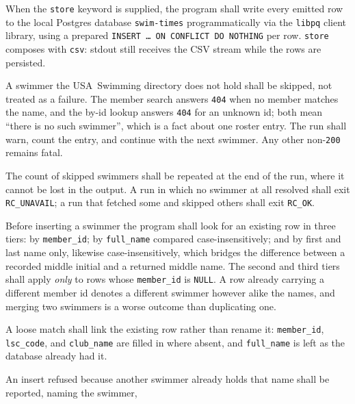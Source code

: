 \documentclass[12pt]{article}
\newcommand{\code}[1]{\texttt{#1}}
\newcommand{\req}[1]{\textbf{[#1]}}
\begin{document}
\begin{description}[style=nextline]
  \item[\req{REQ-F-70}] When the \code{store} keyword is supplied,
        the program shall write every emitted row to the local
        Postgres database \texttt{swim-times} programmatically via
        the \texttt{libpq} client library, using a prepared
        \texttt{INSERT \dots\ ON~CONFLICT~DO~NOTHING} per row.
        \code{store} composes with \code{csv}: stdout still
        receives the CSV stream while the rows are persisted.
  \item[\req{REQ-F-77}] A swimmer the USA~Swimming directory does not
        hold shall be skipped, not treated as a failure.  The member
        search answers \code{404} when no member matches the name, and
        the by-id lookup answers \code{404} for an unknown id; both mean
        ``there is no such swimmer'', which is a fact about one roster
        entry.  The run shall warn, count the entry, and continue with
        the next swimmer.  Any other non-\code{200} remains fatal.
  \item[\req{REQ-F-77a}] The count of skipped swimmers shall be
        repeated at the end of the run, where it cannot be lost in the
        output.  A run in which no swimmer at all resolved shall exit
        \code{RC\_UNAVAIL}; a run that fetched some and skipped others
        shall exit \code{RC\_OK}.
  \item[\req{REQ-F-78}] Before inserting a swimmer the program shall
        look for an existing row in three tiers: by \code{member\_id};
        by \code{full\_name} compared case-insensitively; and by first
        and last name only, likewise case-insensitively, which bridges
        the difference between a recorded middle initial and a returned
        middle name.  The second and third tiers shall apply
        \emph{only} to rows whose \code{member\_id} is \code{NULL}.  A
        row already carrying a different member id denotes a different
        swimmer however alike the names, and merging two swimmers is a
        worse outcome than duplicating one.
  \item[\req{REQ-F-79}] A loose match shall link the existing row
        rather than rename it: \code{member\_id}, \code{lsc\_code}, and
        \code{club\_name} are filled in where absent, and
        \code{full\_name} is left as the database already had it.
  \item[\req{REQ-F-80}] An insert refused because another swimmer
        already holds that name shall be reported, naming the swimmer,

\end{description}
\end{document}
